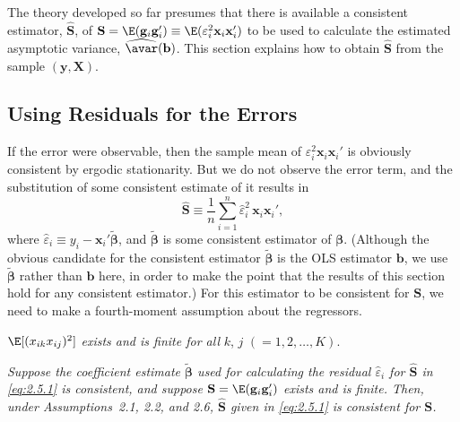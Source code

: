 
The theory developed so far presumes that there is available a consistent estimator,
$\widehat{\mathbf{S}}$, of $\mathbf{S} = \E(\mathbf{g}_i \mathbf{g}_i') \equiv \E(\varepsilon_i^2 \mathbf{x}_i \mathbf{x}_i')$
to be used to calculate the estimated asymptotic
variance, $\widehat{\avar}(\mathbf{b})$.  This section explains how to obtain $\widehat{\mathbf{S}}$
from the sample $(\mathbf{y}, \mathbf{X})$.

\subsection*{Using Residuals for the Errors}

If the error were observable, then the sample mean of $\varepsilon_i^2 \mathbf{x}_i \mathbf{x}_i'$
is obviously consistent by ergodic stationarity.  But we do not observe the error term,
and the substitution of some consistent estimate of it results in
\begin{equation}
  \widehat{\mathbf{S}} \equiv \frac{1}{n} \sum_{i=1}^{n} \hat{\varepsilon}_i^2\,
    \mathbf{x}_i \mathbf{x}_i',
  \label{eq:2.5.1}
\end{equation}
where $\hat{\varepsilon}_i \equiv y_i - \mathbf{x}_i' \widetilde{\bm{\beta}}$, and
$\widetilde{\bm{\beta}}$ is some consistent estimator of $\bm{\beta}$.
(Although the obvious candidate for the consistent estimator
$\widetilde{\bm{\beta}}$ is the OLS estimator $\mathbf{b}$, we use
$\widetilde{\bm{\beta}}$ rather than $\mathbf{b}$ here, in order to make the point
that the results of this section hold for any consistent estimator.)
For this estimator to be consistent for $\mathbf{S}$, we need to make a fourth-moment
assumption about the regressors.

\begin{assumption}
\label{ass:2.6}
$\E[(x_{ik} x_{ij})^2]$ \emph{exists and is finite for all} $k$, $j$ $(= 1, 2, \ldots, K)$.
\end{assumption}

\begin{proposition}
\label{prop:2.4}
\emph{Suppose the coefficient estimate $\widetilde{\bm{\beta}}$ used for calculating the
residual $\hat{\varepsilon}_i$ for $\widehat{\mathbf{S}}$ in \eqref{eq:2.5.1} is consistent,
and suppose $\mathbf{S} = \E(\mathbf{g}_i \mathbf{g}_i')$ exists and is finite.  Then,
under Assumptions~2.1, 2.2, and 2.6, $\widehat{\mathbf{S}}$ given in \eqref{eq:2.5.1} is
consistent for $\mathbf{S}$.}
\end{proposition}

